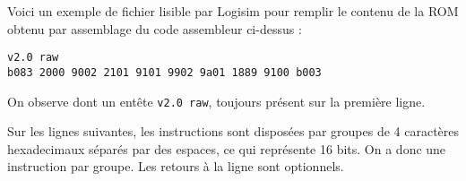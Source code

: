 \documentclass{article}
\begin{document}
    Voici un exemple de fichier lisible par Logisim pour remplir le contenu de la ROM obtenu par assemblage du code assembleur ci-dessus :
    \begin{lstlisting}
v2.0 raw
b083 2000 9002 2101 9101 9902 9a01 1889 9100 b003
    \end{lstlisting}

    On observe dont un entête \texttt{v2.0 raw}, toujours présent sur la première ligne.

    Sur les lignes suivantes, les instructions sont disposées par groupes de 4 caractères hexadecimaux séparés par des espaces, ce qui représente 16 bits.
    On a donc une instruction par groupe.
    Les retours à la ligne sont optionnels.
\end{document}
